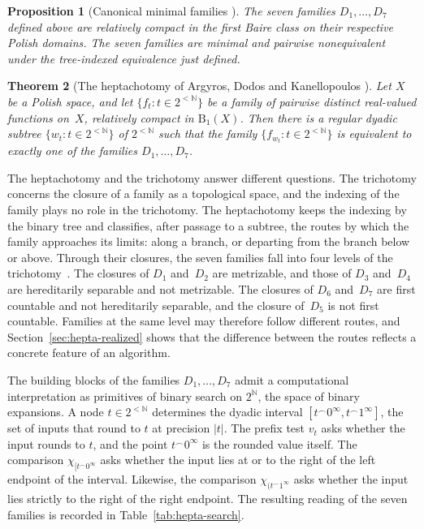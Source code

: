 \documentclass[psamsfonts]{amsart}
\newtheorem{thm}{Theorem}[section]
\newtheorem{prop}[thm]{Proposition}
\theoremstyle{definition}
\theoremstyle{remark}
\numberwithin{equation}{section}
\begin{document}
\begin{prop}[Canonical minimal families {\cite[Section~4.3]{argyros2008rosenthal}}]
  \label{prop:canonical-search-families}
  The seven families $D_1,\dots,D_7$ defined above are relatively compact in the first Baire class on their respective Polish domains.
  The seven families are minimal and pairwise nonequivalent under the tree-indexed equivalence just defined.
\end{prop}

\begin{thm}[The heptachotomy of Argyros, Dodos and Kanellopoulos {\cite[Theorem~2]{argyros2008rosenthal}}]\label{thm:heptachotomy}
  Let $X$ be a Polish space, and let $\{f_t:t\in2^{<\mathbb{N}}\}$ be a family of pairwise distinct real-valued functions on~$X$, relatively compact in $\mathrm{B}_1(X)$.
  Then there is a regular dyadic subtree $\{w_t:t\in2^{<\mathbb{N}}\}$ of $2^{<\mathbb{N}}$ such that the family $\{f_{w_t}:t\in2^{<\mathbb{N}}\}$ is equivalent to exactly one of the families $D_1,\dots,D_7$.
\end{thm}

The heptachotomy and the trichotomy answer different questions.
The trichotomy concerns the closure of a family as a topological space, and the indexing of the family plays no role in the trichotomy.
The heptachotomy keeps the indexing by the binary tree and classifies, after passage to a subtree, the routes by which the family approaches its limits: along a branch, or departing from the branch below or above.
Through their closures, the seven families fall into four levels of the trichotomy~\cite[Section~4.3]{argyros2008rosenthal}.
The closures of $D_1$ and~$D_2$ are metrizable, and those of $D_3$ and~$D_4$ are hereditarily separable and not metrizable.
The closures of $D_6$ and~$D_7$ are first countable and not hereditarily separable, and the closure of~$D_5$ is not first countable.
Families at the same level may therefore follow different routes, and Section~\ref{sec:hepta-realized} shows that the difference between the routes reflects a concrete feature of an algorithm.

The building blocks of the families $D_1,\dots,D_7$ admit a computational interpretation as primitives of binary search on $2^{\mathbb{N}}$, the space of binary expansions.
A node $t\in2^{<\mathbb{N}}$ determines the dyadic interval $[t^\frown0^\infty,t^\frown1^\infty]$, the set of inputs that round to $t$ at precision $|t|$.
The prefix test $v_t$ asks whether the input rounds to $t$, and the point $t^\frown0^\infty$ is the rounded value itself.
The comparison $\chi_{[t^\frown0^\infty}$ asks whether the input lies at or to the right of the left endpoint of the interval.
Likewise, the comparison $\chi_{(t^\frown1^\infty}$ asks whether the input lies strictly to the right of the right endpoint.
The resulting reading of the seven families is recorded in Table~\ref{tab:hepta-search}.
\end{document}

